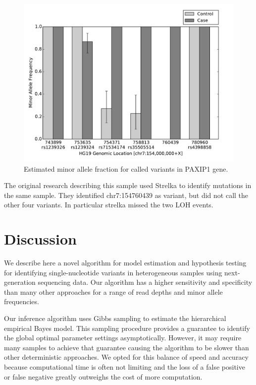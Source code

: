 \documentclass[11pt,reqno]{amsart}
\begin{document}
\begin{figure}[h]
\begin{center}
\includegraphics[width=120mm]{pdf_figs/HCC1187_MuBarPlot.pdf}
\caption{Estimated minor allele fraction for called variants in PAXIP1 gene.}
\label{fig:brca_MAF}
\end{center}
\end{figure}

The original research describing this sample used Strelka to identify mutations in the same sample. They identified chr7:154760439 as variant, but did not call the other four variants. In particular strelka missed the two LOH events. %

\section{Discussion}

We describe here a novel algorithm for model estimation and hypothesis testing for identifying single-nucleotide variants in heterogeneous samples using next-generation sequencing data. Our algorithm has a higher sensitivity and specificity than many other approaches for a range of read depths and minor allele frequencies.

Our inference algorithm uses Gibbs sampling to estimate the hierarchical empirical Bayes model. This sampling procedure provides a guarantee to identify the global optimal parameter settings asymptotically. However, it may require many samples to achieve that guarantee causing the algorithm to be slower than other deterministic approaches. We opted for this balance of speed and accuracy because computational time is often not limiting and the loss of a false positive or false negative greatly outweighs the cost of more computation.
\end{document}
